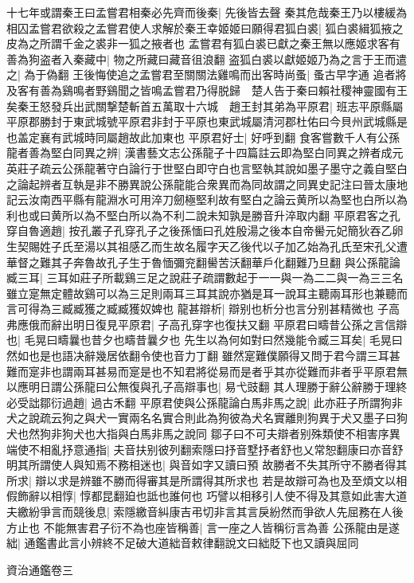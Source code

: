 十七年或謂秦王曰孟嘗君相秦必先齊而後秦|{
	先後皆去聲}
秦其危哉秦王乃以樓緩為相囚孟嘗君欲殺之孟嘗君使人求解於秦王幸姬姬曰願得君狐白裘|{
	狐白裘緝狐掖之皮為之所謂千金之裘非一狐之掖者也}
孟嘗君有狐白裘已獻之秦王無以應姬求客有善為狗盗者入秦藏中|{
	物之所藏曰藏音徂浪翻}
盗狐白裘以獻姬姬乃為之言于王而遣之|{
	為于偽翻}
王後悔使追之孟嘗君至關關法雞鳴而出客時尚蚤|{
	蚤古早字通}
追者將及客有善為鷄鳴者野鷄聞之皆鳴孟嘗君乃得脱歸　楚人告于秦曰賴社稷神靈國有王矣秦王怒發兵出武關撃楚斬首五萬取十六城　趙王封其弟為平原君|{
	班志平原縣屬平原郡勝封于東武城號平原君非封于平原也東武城屬清河郡杜佑曰今貝州武城縣是也盖定襄有武城時同屬趙故此加東也}
平原君好士|{
	好呼到翻}
食客嘗數千人有公孫龍者善為堅白同異之辨|{
	漢書藝文志公孫龍子十四篇註云即為堅白同異之辨者成元英莊子疏云公孫龍著守白論行于世堅白即守白也言堅執其說如墨子墨守之義自堅白之論起辨者互執是非不勝異說公孫龍能合衆異而為同故謂之同異史記注曰晉太康地記云汝南西平縣有龍淵水可用淬刀劒極堅利故有堅白之論云黄所以為堅也白所以為利也或曰黄所以為不堅白所以為不利二說未知孰是勝音升淬取内翻}
平原君客之孔穿自魯適趙|{
	按孔叢子孔穿孔子之後孫愐曰孔姓殷湯之後本自帝嚳元妃簡狄吞乙卵生契賜姓子氏至湯以其祖感乙而生故名履字天乙後代以子加乙始為孔氏至宋孔父遭華督之難其子奔魯故孔子生于魯愐彌兖翻嚳苦沃翻華戶化翻難乃旦翻}
與公孫龍論臧三耳|{
	三耳如莊子所載鷄三足之說莊子疏謂數起于一一與一為二二與一為三三名雖立寔無定體故鷄可以為三足則兩耳三耳其說亦猶是耳一說耳主聽兩耳形也兼聽而言可得為三臧臧獲之臧臧獲奴婢也}
龍甚辯析|{
	辯别也析分也言分别甚精微也}
子高弗應俄而辭出明日復見平原君|{
	子高孔穿字也復扶又翻}
平原君曰疇昔公孫之言信辯也|{
	毛晃曰疇曩也昔夕也疇昔曩夕也}
先生以為何如對曰然幾能令臧三耳矣|{
	毛晃曰然如也是也語决辭幾居依翻令使也音力丁翻}
雖然寔難僕願得又問于君今謂三耳甚難而寔非也謂兩耳甚易而寔是也不知君將從易而是者乎其亦從難而非者乎平原君無以應明日謂公孫龍曰公無復與孔子高辯事也|{
	易弋豉翻}
其人理勝于辭公辭勝于理終必受詘鄒衍過趙|{
	過古禾翻}
平原君使與公孫龍論白馬非馬之說|{
	此亦莊子所謂狗非犬之說疏云狗之與犬一實兩名名實合則此為狗彼為犬名實離則狗異于犬又墨子曰狗犬也然狗非狗犬也大指與白馬非馬之說同}
鄒子曰不可夫辯者别殊類使不相害序異端使不相亂抒意通指|{
	夫音扶别彼列翻索隱曰抒音墅抒者舒也乂常恕翻康曰亦音舒}
明其所謂使人與知焉不務相迷也|{
	與音如字又讀曰預}
故勝者不失其所守不勝者得其所求|{
	辯以求是辨雖不勝而得審其是所謂得其所求也}
若是故辯可為也及至煩文以相假飾辭以相惇|{
	惇都昆翻廹也詆也誰何也}
巧譬以相移引人使不得及其意如此害大道夫繳紛爭言而競後息|{
	索隱繳音糾康吉弔切非言其言戾紛然而爭欲人先屈務在人後方止也}
不能無害君子衍不為也座皆稱善|{
	言一座之人皆稱衍言為善}
公孫龍由是遂絀|{
	通鑑書此言小辨終不足破大道絀音敕律翻說文曰絀貶下也又讀與屈同}


資治通鑑卷三
